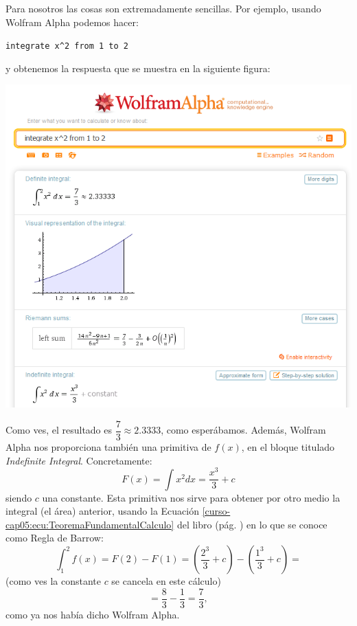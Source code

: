 \documentclass[10pt,a4paper]{article}\usepackage[]{graphicx}\usepackage[]{color}
\begin{document}
Para nosotros las cosas son extremadamente sencillas. Por ejemplo, usando Wolfram Alpha podemos hacer:
\begin{center}
  {\verb&integrate x^2 from 1 to 2&}
\end{center}
y obtenemos la respuesta que se muestra en la siguiente figura:
\begin{center}
    \includegraphics[width=15.5cm]{../fig/Tut05-41.png}
\end{center}
Como ves, el resultado es $\dfrac{7}{3}\approx 2.3333$, como esperábamos. Además, Wolfram Alpha nos proporciona también una primitiva de $f(x)$, en el bloque titulado {\em Indefinite Integral}. Concretamente:
\[F(x) = \int x^2 dx = \dfrac{x^3}{3} + c\]
siendo $c$ una constante. Esta primitiva nos sirve para obtener por otro medio la integral (el área) anterior, usando la Ecuación \ref{curso-cap05:ecu:TeoremaFundamentalCalculo} del libro (pág. \pageref{curso-cap05:ecu:TeoremaFundamentalCalculo}) en lo que se conoce como Regla de Barrow:
\[
\int_1 ^2 f(x) = F(2) - F(1) =
\left(\dfrac{2^3}{3} + c\right) - \left(\dfrac{1^3}{3} + c\right)=
\]
(como ves la constante $c$ se cancela en este cálculo)
\[= \dfrac{8}{3}- \dfrac{1}{3} = \dfrac{7}{3},\]
como ya nos había dicho Wolfram Alpha.
\end{document}
